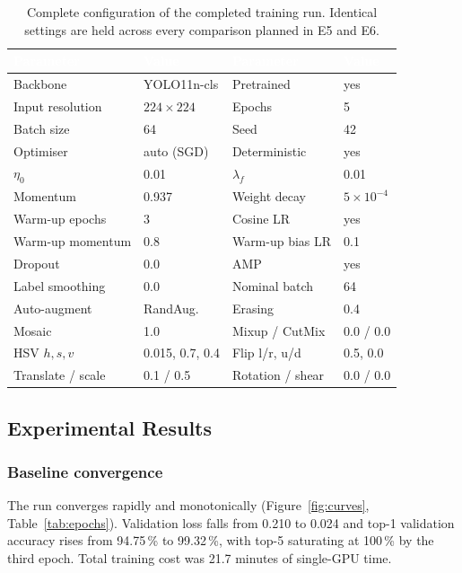 \documentclass[journal]{IEEEtran}
\newcommand{\hd}[1]{\textcolor{white}{\textbf{#1}}}
\begin{document}
\begin{table}[t]
\centering
\caption{Complete configuration of the completed training run. Identical
settings are held across every comparison planned in E5 and E6.}
\label{tab:hyper}
\footnotesize
\setlength{\tabcolsep}{3.5pt}
\begin{tabular}{p{1.95cm}p{1.65cm}p{1.8cm}p{1.05cm}}
\rowcolor{hdr}
\hd{Parameter} & \hd{Value} & \hd{Parameter} & \hd{Value} \\
\midrule
\rowcolor{rowlite}
Backbone & YOLO11n-cls & Pretrained & yes \\
Input resolution & $224\times224$ & Epochs & 5 \\
\rowcolor{rowlite}
Batch size & 64 & Seed & 42 \\
Optimiser & auto (SGD) & Deterministic & yes \\
\rowcolor{rowlite}
$\eta_0$ & 0.01 & $\lambda_f$ & 0.01 \\
Momentum & 0.937 & Weight decay & $5\times10^{-4}$ \\
\rowcolor{rowlite}
Warm-up epochs & 3 & Cosine LR & yes \\
Warm-up momentum & 0.8 & Warm-up bias LR & 0.1 \\
\rowcolor{rowlite}
Dropout & 0.0 & AMP & yes \\
Label smoothing & 0.0 & Nominal batch & 64 \\
\rowcolor{rowlite}
Auto-augment & RandAug. & Erasing & 0.4 \\
Mosaic & 1.0 & Mixup / CutMix & 0.0 / 0.0 \\
\rowcolor{rowlite}
HSV $h,s,v$ & 0.015, 0.7, 0.4 & Flip l/r, u/d & 0.5, 0.0 \\
Translate / scale & 0.1 / 0.5 & Rotation / shear & 0.0 / 0.0 \\
\bottomrule
\end{tabular}
\end{table}

\subsection{Experimental Results}

\subsubsection{Baseline convergence}
The run converges rapidly and monotonically (Figure~\ref{fig:curves},
Table~\ref{tab:epochs}). Validation loss falls from 0.210 to 0.024 and
top-1 validation accuracy rises from 94.75\,\% to 99.32\,\%, with top-5
saturating at 100\,\% by the third epoch. Total training cost was 21.7
minutes of single-GPU time.
\end{document}
